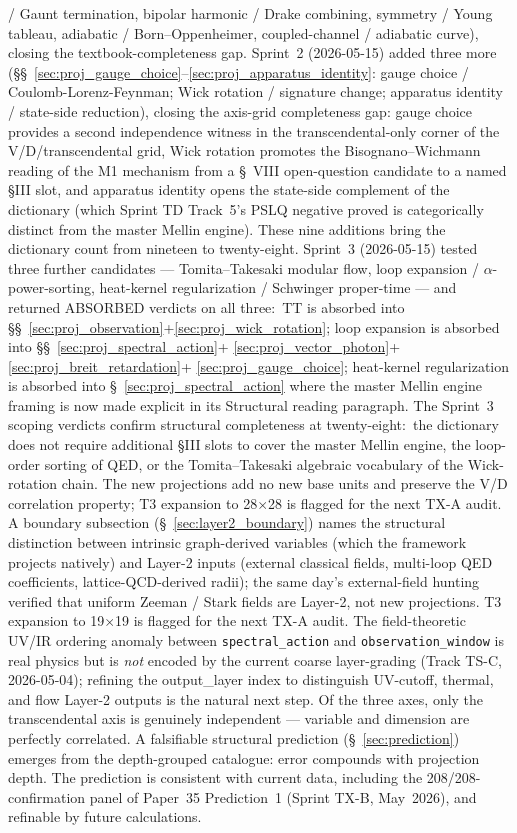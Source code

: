 \documentclass[11pt]{article}
\begin{document}
/ Gaunt termination, bipolar harmonic / Drake combining, symmetry /
Young tableau, adiabatic / Born--Oppenheimer, coupled-channel /
adiabatic curve), closing the textbook-completeness gap.  Sprint~2
(2026-05-15) added three more
(\S\S~\ref{sec:proj_gauge_choice}--\ref{sec:proj_apparatus_identity}:
gauge choice / Coulomb-Lorenz-Feynman; Wick rotation / signature
change; apparatus identity / state-side reduction), closing the
axis-grid completeness gap: gauge choice provides a second
independence witness in the transcendental-only corner of the
V/D/transcendental grid, Wick rotation promotes the
Bisognano--Wichmann reading of the M1 mechanism from a \S~VIII
open-question candidate to a named §III slot, and apparatus identity
opens the state-side complement of the dictionary (which Sprint TD
Track~5's PSLQ negative proved is categorically distinct from the
master Mellin engine).  These nine additions bring the dictionary
count from nineteen to twenty-eight.  Sprint~3 (2026-05-15) tested
three further candidates --- Tomita--Takesaki modular flow, loop
expansion / $\alpha$-power-sorting, heat-kernel regularization / Schwinger
proper-time --- and returned ABSORBED verdicts on all three:\ TT is
absorbed into \S\S~\ref{sec:proj_observation}+\ref{sec:proj_wick_rotation};
loop expansion is absorbed into \S\S~\ref{sec:proj_spectral_action}+%
\ref{sec:proj_vector_photon}+\ref{sec:proj_breit_retardation}+%
\ref{sec:proj_gauge_choice}; heat-kernel regularization is absorbed
into \S~\ref{sec:proj_spectral_action} where the master Mellin engine
framing is now made explicit in its Structural reading paragraph.  The
Sprint~3 scoping verdicts confirm structural completeness at twenty-eight:\
the dictionary does not require additional §III slots to cover the master
Mellin engine, the loop-order sorting of QED, or the Tomita--Takesaki
algebraic vocabulary of the Wick-rotation chain.  The new projections
add no new base units and preserve the V/D correlation property; T3
expansion to 28$\times$28 is flagged for the next TX-A audit.  A boundary subsection
(\S~\ref{sec:layer2_boundary}) names the structural distinction
between intrinsic graph-derived variables (which the framework
projects natively) and Layer-2 inputs (external classical fields,
multi-loop QED coefficients, lattice-QCD-derived radii); the same
day's external-field hunting verified that uniform Zeeman / Stark
fields are Layer-2, not new projections.  T3 expansion to
19$\times$19 is flagged for the next TX-A audit.  The
field-theoretic UV/IR ordering anomaly between \texttt{spectral\_action}
and \texttt{observation\_window} is real physics but is \emph{not}
encoded by the current coarse layer-grading (Track TS-C, 2026-05-04);
refining the output\_layer index to distinguish UV-cutoff, thermal,
and flow Layer-2 outputs is the natural next step.  Of the three axes, only the
transcendental axis is genuinely independent --- variable and
dimension are perfectly correlated.  A falsifiable structural
prediction (\S~\ref{sec:prediction}) emerges from the depth-grouped
catalogue: error compounds with projection depth.  The prediction is
consistent with current data, including the
208/208-confirmation panel of Paper~35 Prediction~1
(Sprint TX-B, May~2026), and refinable by future calculations.
\end{document}
